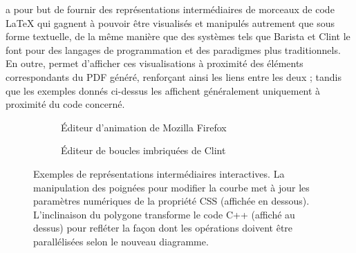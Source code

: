 \iLaTeX{} a pour but de fournir des représentations intermédiaires de morceaux de code \LaTeX{} qui gagnent à pouvoir être visualisés et manipulés autrement que sous forme textuelle, de la même manière que des systèmes tels que Barista et Clint le font pour des langages de programmation et des paradigmes plus traditionnels.
En outre, \iLaTeX{} permet d'afficher ces visualisations à proximité des éléments correspondants du PDF généré, renforçant ainsi les liens entre les deux ; tandis que les exemples donnés ci-dessus les affichent généralement uniquement à proximité du code concerné.

\begin{figure}[ht]
    \center
    \begin{subfigure}[t]{8cm}
        \centering{}
        \caption{Éditeur d'animation de Mozilla Firefox}
        \label{subfig:firefox-anim-editor}
    \end{subfigure}
    \begin{subfigure}[t]{8cm}
        \centering{}
        \caption{Éditeur de boucles imbriquées de Clint~\cite{zinenko2015manipulating}}
        \label{subfig:clint}
    \end{subfigure}
    
    \caption{Exemples de représentations intermédiaires interactives.  La manipulation des poignées pour modifier la courbe met à jour les paramètres numériques de la propriété CSS (affichée en dessous).  L'inclinaison du polygone transforme le code C++ (affiché au dessus) pour refléter la façon dont les opérations doivent être parallélisées selon le nouveau diagramme.}
    \label{fig:intermediate-representations-examples}
\end{figure}





